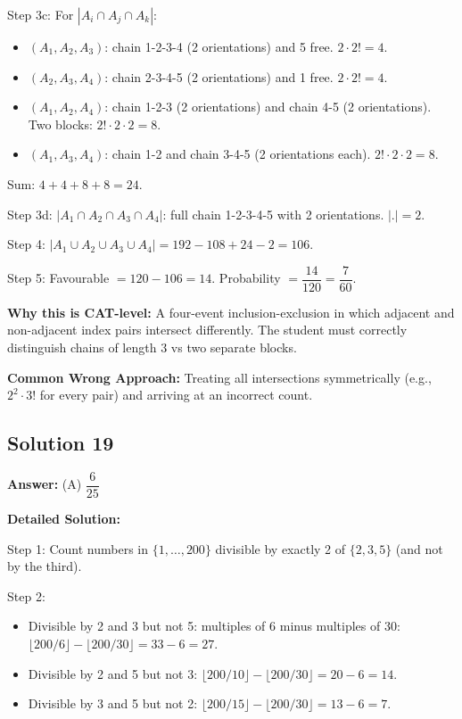 \documentclass[11pt]{article}
\begin{document}
Step 3c: For \( |A_i \cap A_j \cap A_k| \):
\begin{itemize}
\item \( (A_1, A_2, A_3) \): chain 1-2-3-4 (2 orientations) and 5 free. \( 2 \cdot 2! = 4 \).
\item \( (A_2, A_3, A_4) \): chain 2-3-4-5 (2 orientations) and 1 free. \( 2 \cdot 2! = 4 \).
\item \( (A_1, A_2, A_4) \): chain 1-2-3 (2 orientations) and chain 4-5 (2 orientations). Two blocks: \( 2! \cdot 2 \cdot 2 = 8 \).
\item \( (A_1, A_3, A_4) \): chain 1-2 and chain 3-4-5 (2 orientations each). \( 2! \cdot 2 \cdot 2 = 8 \).
\end{itemize}
Sum: \( 4+4+8+8 = 24 \).

Step 3d: \( |A_1 \cap A_2 \cap A_3 \cap A_4| \): full chain 1-2-3-4-5 with 2 orientations. \( |.| = 2 \).

Step 4: \( |A_1 \cup A_2 \cup A_3 \cup A_4| = 192 - 108 + 24 - 2 = 106 \).

Step 5: Favourable \( = 120 - 106 = 14 \). Probability \( = \dfrac{14}{120} = \dfrac{7}{60} \).

\textbf{Why this is CAT-level:} A four-event inclusion-exclusion in which adjacent and non-adjacent index pairs intersect differently. The student must correctly distinguish chains of length 3 vs two separate blocks.

\textbf{Common Wrong Approach:} Treating all intersections symmetrically (e.g., \( 2^2 \cdot 3! \) for every pair) and arriving at an incorrect count.

\subsection*{Solution 19}
\textbf{Answer:} (A) \( \dfrac{6}{25} \)

\textbf{Detailed Solution:}

Step 1: Count numbers in \( \{1, \ldots, 200\} \) divisible by exactly 2 of \( \{2, 3, 5\} \) (and not by the third).

Step 2: 
\begin{itemize}
\item Divisible by 2 and 3 but not 5: multiples of 6 minus multiples of 30: \( \lfloor 200/6 \rfloor - \lfloor 200/30 \rfloor = 33 - 6 = 27 \).
\item Divisible by 2 and 5 but not 3: \( \lfloor 200/10 \rfloor - \lfloor 200/30 \rfloor = 20 - 6 = 14 \).
\item Divisible by 3 and 5 but not 2: \( \lfloor 200/15 \rfloor - \lfloor 200/30 \rfloor = 13 - 6 = 7 \).
\end{itemize}
\end{document}
